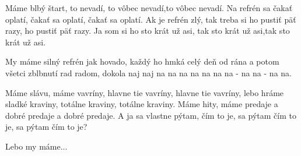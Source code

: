 \resetVars
{}
\MakeHeader
\Lyrics

Máme blbý štart, to nevadí, to vôbec nevadí,to vôbec nevadí.
Na refrén sa čakať oplatí, čakať sa oplatí, čakať sa oplatí.
Ak je refrén zlý, tak treba si ho pustiť päť razy, ho pustiť päť razy.
Ja som si ho sto krát už asi, tak sto krát už asi,tak sto krát už asi.

My máme silný refrén jak hovado,
každý ho hmká celý deň od rána
a potom všetci zblbnutí rad radom,
dokola naj naj na na na na na na
na - na na - na na.

Máme slávu, máme vavríny, hlavne tie vavríny, hlavne tie vavríny,
lebo hráme sladké kraviny, totálne kraviny, totálne kraviny.
Máme hity, máme predaje a dobré predaje a dobré predaje.
A ja sa vlastne pýtam, čím to je, sa pýtam čím to je, sa pýtam čím to je?

Lebo my máme...

\Next
